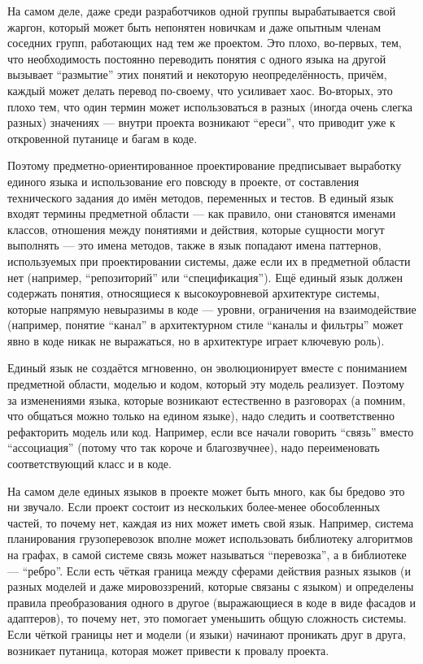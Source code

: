 \documentclass[a5paper]{article}
\begin{document}
На самом деле, даже среди разработчиков одной группы вырабатывается свой жаргон, который может быть непонятен новичкам и даже опытным членам соседних групп, работающих над тем же проектом. Это плохо, во-первых, тем, что необходимость постоянно переводить понятия с одного языка на другой вызывает ``размытие'' этих понятий и некоторую неопределённость, причём, каждый может делать перевод по-своему, что усиливает хаос. Во-вторых, это плохо тем, что один термин может использоваться в разных (иногда очень слегка разных) значениях --- внутри проекта возникают ``ереси'', что приводит уже к откровенной путанице и багам в коде.

Поэтому предметно-ориентированное проектирование предписывает выработку единого языка и использование его повсюду в проекте, от составления технического задания до имён методов, переменных и тестов. В единый язык входят термины предметной области --- как правило, они становятся именами классов, отношения между понятиями и действия, которые сущности могут выполнять --- это имена методов, также в язык попадают имена паттернов, используемых при проектировании системы, даже если их в предметной области нет (например, ``репозиторий'' или ``спецификация''). Ещё единый язык должен содержать понятия, относящиеся к высокоуровневой архитектуре системы, которые напрямую невыразимы в коде --- уровни, ограничения на взаимодействие (например, понятие ``канал'' в архитектурном стиле ``каналы и фильтры'' может явно в коде никак не выражаться, но в архитектуре играет ключевую роль).

Единый язык не создаётся мгновенно, он эволюционирует вместе с пониманием предметной области, моделью и кодом, который эту модель реализует. Поэтому за изменениями языка, которые возникают естественно в разговорах (а помним, что общаться можно только на едином языке), надо следить и соответственно рефакторить модель или код. Например, если все начали говорить ``связь'' вместо ``ассоциация'' (потому что так короче и благозвучнее), надо переименовать соответствующий класс и в коде.

На самом деле единых языков в проекте может быть много, как бы бредово это ни звучало. Если проект состоит из нескольких более-менее обособленных частей, то почему нет, каждая из них может иметь свой язык. Например, система планирования грузоперевозок вполне может использовать библиотеку алгоритмов на графах, в самой системе связь может называться ``перевозка'', а в библиотеке --- ``ребро''. Если есть чёткая граница между сферами действия разных языков (и разных моделей и даже мировоззрений, которые связаны с языком) и определены правила преобразования одного в другое (выражающиеся в коде в виде фасадов и адаптеров), то почему нет, это помогает уменьшить общую сложность системы. Если чёткой границы нет и модели (и языки) начинают проникать друг в друга, возникает путаница, которая может привести к провалу проекта.
\end{document}
